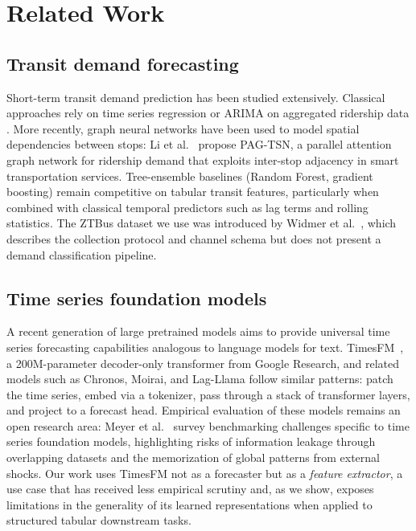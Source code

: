 \section{Related Work}
\label{sec:related}

\subsection{Transit demand forecasting}

Short-term transit demand prediction has been studied extensively. Classical
approaches rely on time series regression or ARIMA on aggregated ridership
data \cite{box1976timeseries}. More recently, graph neural networks have
been used to model spatial dependencies between stops: Li et
al.~\cite{li2023pagtsn} propose PAG-TSN, a parallel attention graph network
for ridership demand that exploits inter-stop adjacency in smart
transportation services. Tree-ensemble baselines (Random Forest, gradient
boosting) remain competitive on tabular transit features, particularly
when combined with classical temporal predictors such as lag terms and
rolling statistics. The ZTBus dataset we use was introduced by Widmer et
al.~\cite{widmer2023ztbus}, which describes the collection protocol and
channel schema but does not present a demand classification pipeline.

\subsection{Time series foundation models}

A recent generation of large pretrained models aims to provide universal
time series forecasting capabilities analogous to language models for text.
TimesFM~\cite{das2024timesfm}, a 200M-parameter decoder-only transformer
from Google Research, and related models such as Chronos, Moirai, and
Lag-Llama follow similar patterns: patch the time series, embed via a
tokenizer, pass through a stack of transformer layers, and project to a
forecast head. Empirical evaluation of these models remains an open
research area: Meyer et al.~\cite{meyer2025benchmarking} survey
benchmarking challenges specific to time series foundation models,
highlighting risks of information leakage through overlapping datasets
and the memorization of global patterns from external shocks. Our work
uses TimesFM not as a forecaster but as a \emph{feature extractor}, a use
case that has received less empirical scrutiny and, as we show, exposes
limitations in the generality of its learned representations when applied
to structured tabular downstream tasks.

